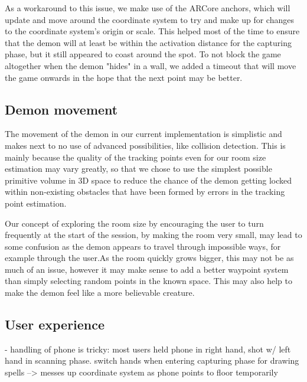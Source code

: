 As a workaround to this issue, we make use of the ARCore anchors, which will update and move around the coordinate system to try and make up for changes to the coordinate system's origin or scale. This helped most of the time to ensure that the demon will at least be within the activation distance for the capturing phase, but it still appeared to coast around the spot. To not block the game altogether when the demon "hides" in a wall, we added a timeout that will move the game onwards in the hope that the next point may be better.

\subsection{Demon movement}
The movement of the demon in our current implementation is simplistic and makes next to no use of advanced possibilities, like collision detection. This is mainly because the quality of the tracking points even for our room size estimation may vary greatly, so that we chose to use the simplest possible primitive volume in 3D space to reduce the chance of the demon getting locked within non-existing obstacles that have been formed by errors in the tracking point estimation.

Our concept of exploring the room size by encouraging the user to turn frequently at the start of the session, by making the room very small, may lead to some confusion as the demon appears to travel through impossible ways, for example through the user.As the room quickly grows bigger, this may not be as much of an issue, however it may make sense to add a better waypoint system than simply selecting random points in the known space. This may also help to make the demon feel like a more believable creature.

\subsection{User experience}
- handling of phone is tricky: most users held phone in right hand, shot w/ left hand in scanning phase. switch hands when entering capturing phase for drawing spells --> messes up coordinate system as phone points to floor temporarily

